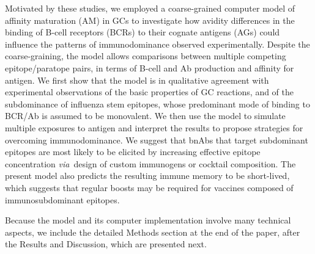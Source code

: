 \documentclass[utf8]{frontiersHLTH}%
\def\via {{\it via}}
\begin{document}
Motivated by these studies, we employed a coarse-grained computer model
of affinity maturation (AM) in GCs to investigate how avidity
differences in the binding of B-cell receptors (BCRs) to their cognate antigens
(AGs) could influence the patterns of immunodominance observed
experimentally. Despite the coarse-graining, the model allows
comparisons between multiple competing epitope/paratope pairs,
in terms of B-cell and Ab production and affinity for antigen. We first show
that the model is in qualitative agreement with experimental observations of
the basic properties of GC reactions,
and of the subdominance of influenza stem epitopes, whose predominant mode of binding to BCR/Ab
is assumed to be monovalent.
We then use the model to simulate multiple exposures to antigen
and interpret the results to propose strategies for
overcoming immunodominance. We suggest that bnAbs that target subdominant
epitopes are most likely to be elicited by increasing effective epitope
concentration \via~design of custom immunogens or cocktail composition.
The present model also predicts the resulting immune memory to be
short-lived, which suggests that regular boosts may be required for vaccines
composed of immunosubdominant epitopes.

Because the model and its computer implementation involve many technical
aspects, we include the detailed Methods section at the end of the paper, after
the Results and Discussion, which are presented next.
\end{document}
